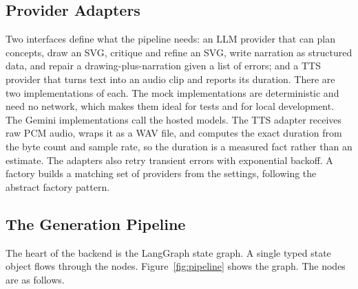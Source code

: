 \documentclass[conference]{IEEEtran}
\begin{document}
\subsection{Provider Adapters}
Two interfaces define what the pipeline needs: an LLM provider that can plan
concepts, draw an SVG, critique and refine an SVG, write narration as structured
data, and repair a drawing-plus-narration given a list of errors; and a TTS
provider that turns text into an audio clip and reports its duration. There are
two implementations of each. The mock implementations are deterministic and need
no network, which makes them ideal for tests and for local development. The
Gemini implementations call the hosted models. The TTS adapter receives raw PCM
audio, wraps it as a WAV file, and computes the exact duration from the byte
count and sample rate, so the duration is a measured fact rather than an
estimate. The adapters also retry transient errors with exponential backoff. A
factory builds a matching set of providers from the settings, following the
abstract factory pattern.

\subsection{The Generation Pipeline}
The heart of the backend is the LangGraph state graph. A single typed state
object flows through the nodes. Figure~\ref{fig:pipeline} shows the graph. The
nodes are as follows.
\end{document}
